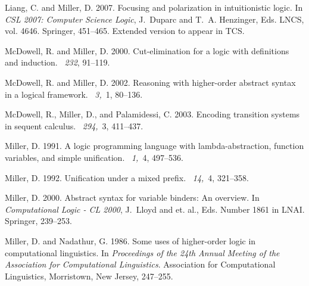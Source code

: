 \documentclass{acmtrans2m}
\begin{document}
\begin{thebibliography}{}
{\sc Liang, C.} {\sc and} {\sc Miller, D.} 2007.
\newblock Focusing and polarization in intuitionistic logic.
\newblock In {\em CSL 2007: Computer Science Logic}, {J.~Duparc} {and} {T.~A.
  Henzinger}, Eds. LNCS, vol. 4646. Springer, 451--465.
\newblock Extended version to appear in TCS.

{\sc McDowell, R.} {\sc and} {\sc Miller, D.} 2000.
\newblock Cut-elimination for a logic with definitions and induction.
~{\em 232}, 91--119.

{\sc McDowell, R.} {\sc and} {\sc Miller, D.} 2002.
\newblock Reasoning with higher-order abstract syntax in a logical framework.
~{\em 3,\/}~1, 80--136.

{\sc McDowell, R.}, {\sc Miller, D.}, {\sc and} {\sc Palamidessi, C.} 2003.
\newblock Encoding transition systems in sequent calculus.
~{\em 294,\/}~3, 411--437.

{\sc Miller, D.} 1991.
\newblock A logic programming language with lambda-abstraction, function
  variables, and simple unification.
~{\em 1,\/}~4, 497--536.

{\sc Miller, D.} 1992.
\newblock Unification under a mixed prefix.
~{\em 14,\/}~4, 321--358.

{\sc Miller, D.} 2000.
\newblock Abstract syntax for variable binders: An overview.
\newblock In {\em Computational Logic - {CL} 2000}, {J.~Lloyd} {and} {{et.
  al.}}, Eds. Number 1861 in LNAI. Springer, 239--253.

{\sc Miller, D.} {\sc and} {\sc Nadathur, G.} 1986.
\newblock Some uses of higher-order logic in computational linguistics.
\newblock In {\em Proceedings of the 24th Annual Meeting of the Association for
  Computational Linguistics}. Association for Computational Linguistics,
  Morristown, New Jersey, 247--255.


\end{thebibliography}
\end{document}
